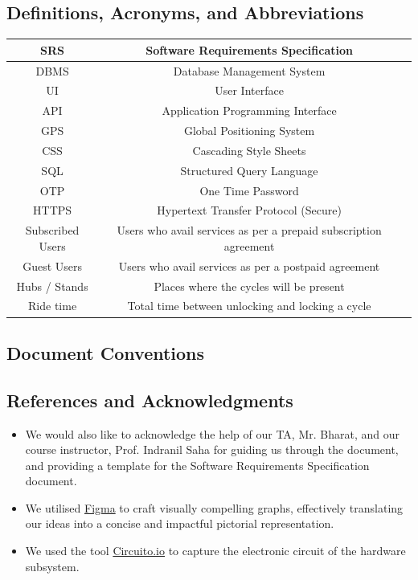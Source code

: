 \documentclass[11pt]{article}
\begin{document}
\subsection{Definitions, Acronyms, and Abbreviations}
\begin{center}
\begin{tabular}{|c|c|p{}}
    \hline
    SRS & Software Requirements Specification \\
    \hline
    DBMS & Database Management System \\
    \hline
    UI & User Interface \\
    \hline
    API & Application Programming Interface \\
    \hline
    GPS & Global Positioning System \\
    \hline
    CSS & Cascading Style Sheets \\
    \hline
    SQL & Structured Query Language \\
    \hline
    OTP & One Time Password \\
    \hline
    HTTPS & Hypertext Transfer Protocol (Secure)\\
    \hline
    Subscribed Users & Users who avail services as per a prepaid subscription agreement \\
    \hline
    Guest Users & Users who avail services as per a postpaid agreement \\
    \hline
    Hubs / Stands & Places where the cycles will be present \\
    \hline
    Ride time & Total time between unlocking and locking a cycle \\
    \hline
\end{tabular}
\end{center}

\subsection{Document Conventions}

\subsection{References and Acknowledgments}
\begin{itemize}
    \item We would also like to acknowledge the help of our TA, Mr. Bharat, and our course instructor, Prof. Indranil Saha for guiding us through the document, and providing a template for the Software Requirements Specification document.
    \item We utilised \href{https://www.figma.com/}{Figma} to craft visually compelling graphs, effectively translating our ideas into a concise and impactful pictorial representation.
    \item We used the tool \href{https://www.circuito.io/}{Circuito.io} to capture the electronic circuit of the hardware subsystem.
\end{itemize}
\end{document}
